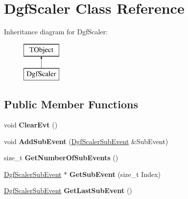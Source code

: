 \hypertarget{class_dgf_scaler}{\section{Dgf\-Scaler Class Reference}
\label{class_dgf_scaler}
}
Inheritance diagram for Dgf\-Scaler\-:\begin{figure}[H]
\begin{center}
\leavevmode
\includegraphics[height=2.000000cm]{class_dgf_scaler}
\end{center}
\end{figure}
\subsection*{Public Member Functions}
\begin{DoxyCompactItemize}
\item 
\hypertarget{class_dgf_scaler_a379aef078983f0664a92af66b0ef595d}{void {\bfseries Clear\-Evt} ()}\label{class_dgf_scaler_a379aef078983f0664a92af66b0ef595d}

\item 
\hypertarget{class_dgf_scaler_a620d4a4dc60fd0a2608bfeb32329780e}{void {\bfseries Add\-Sub\-Event} (\hyperlink{class_dgf_scaler_sub_event}{Dgf\-Scaler\-Sub\-Event} \&Sub\-Event)}\label{class_dgf_scaler_a620d4a4dc60fd0a2608bfeb32329780e}

\item 
\hypertarget{class_dgf_scaler_a1ffa8daad855bc1abda26fa647add076}{size\-\_\-t {\bfseries Get\-Number\-Of\-Sub\-Events} ()}\label{class_dgf_scaler_a1ffa8daad855bc1abda26fa647add076}

\item 
\hypertarget{class_dgf_scaler_a115de3afca80d77ba524de5da88f6214}{\hyperlink{class_dgf_scaler_sub_event}{Dgf\-Scaler\-Sub\-Event} $\ast$ {\bfseries Get\-Sub\-Event} (size\-\_\-t Index)}\label{class_dgf_scaler_a115de3afca80d77ba524de5da88f6214}

\item 
\hypertarget{class_dgf_scaler_a055a0de3e930c7ff88eede1adb74a52e}{\hyperlink{class_dgf_scaler_sub_event}{Dgf\-Scaler\-Sub\-Event} {\bfseries Get\-Last\-Sub\-Event} ()}\label{class_dgf_scaler_a055a0de3e930c7ff88eede1adb74a52e}

\end{DoxyCompactItemize}
